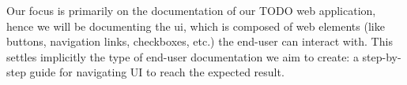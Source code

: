 
Our focus is primarily on the documentation of our TODO web application, hence we will be documenting the \acrfull{ui}, which is composed of web elements (like buttons, navigation links, checkboxes, etc.) the end-user can interact with. This settles implicitly the type of end-user documentation we aim to create: a step-by-step guide for navigating UI to reach the expected result. 

